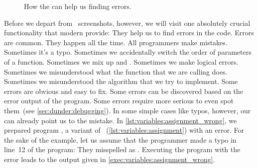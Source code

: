 %
\begin{figure}%
\ContinuedFloat%
\centering%
%
%
%
\floatRowSep%
%
%
%
\floatRowSep%
%
%
%
\caption{How the  can help us finding errors.}%
\label{fig:errorsInIdeC}%
\end{figure}%
%
Before we depart from \pycharm\ screenshots, however, we will visit one absolutely crucial functionality that modern  provide:
They help us to find errors in the code.
Errors are common.
They happen all the time.
All programmers make mistakes.
Sometimes it's a typo.
Sometimes we accidentally switch the order of parameters of a function.
Sometimes we mix up  and .
Sometimes we make logical errors.
Sometimes we misunderstood what the function that we are calling does.
Sometimes we misunderstood the algorithm that we try to implement.
Some errors are obvious and easy to fix.
Some errors can be discovered based on the error output of the program.
Some errors require more serious  to even spot them~(see \cref{sec:dunder:debugging}).
In some simple cases like typos, however, our  can already point us to the mistake.%
%
%
%
In \cref{lst:variables:assignment_wrong}, we prepared program , a variant of ~(\cref{lst:variables:assignment}) with an error.
For the sake of the example, let us assume that the programmer made a typo in line~12 of the program:
They misspelled  as .
Executing the program with the error leads to the output given in \cref{exec:variables:assignment_wrong}.

